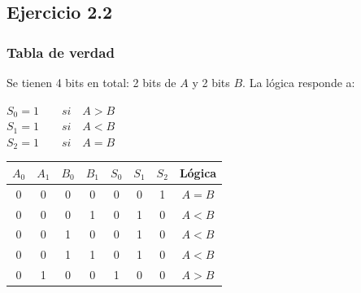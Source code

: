 \subsection{Ejercicio 2.2}
\subsubsection{Tabla de verdad}
\sangria{} Se tienen 4 bits en total: 2 bits de $A$ y 2 bits $B$. La lógica responde a: \begin{center}$S_0 = 1\qquad{} si\quad{}A > B$ \\[10pt] $S_1 = 1\qquad{} si \quad{}A < B$ \\[10pt] $S_2 = 1\qquad{} si\quad{}A = B$\end{center}

\begin{center}
\begin{tabular}{cccc|ccc|c}
\rowcolor[HTML]{FFCCC9} 
\textbf{$A_0$} & \textbf{$A_1$} & \textbf{$B_0$} & \textbf{$B_1$} & \cellcolor[HTML]{ECF4FF}\textbf{$S_0$} & \cellcolor[HTML]{ECF4FF}\textbf{$S_1$} & \cellcolor[HTML]{ECF4FF}\textbf{$S_2$} & \cellcolor[HTML]{9AFF99}\textbf{Lógica} \\ \hline
0              & 0              & 0              & 0              & 0                                      & 0                                      & 1                                      & $A = B$                                 \\
0              & 0              & 0              & 1              & 0                                      & 1                                      & 0                                      & $A < B$                                 \\
0              & 0              & 1              & 0              & 0                                      & 1                                      & 0                                      & $A < B$                                 \\
0              & 0              & 1              & 1              & 0                                      & 1                                      & 0                                      & $A < B$                                 \\
0              & 1              & 0              & 0              & 1                                      & 0                                      & 0                                      & $A > B$                                 \\

\end{tabular}
\end{center}

